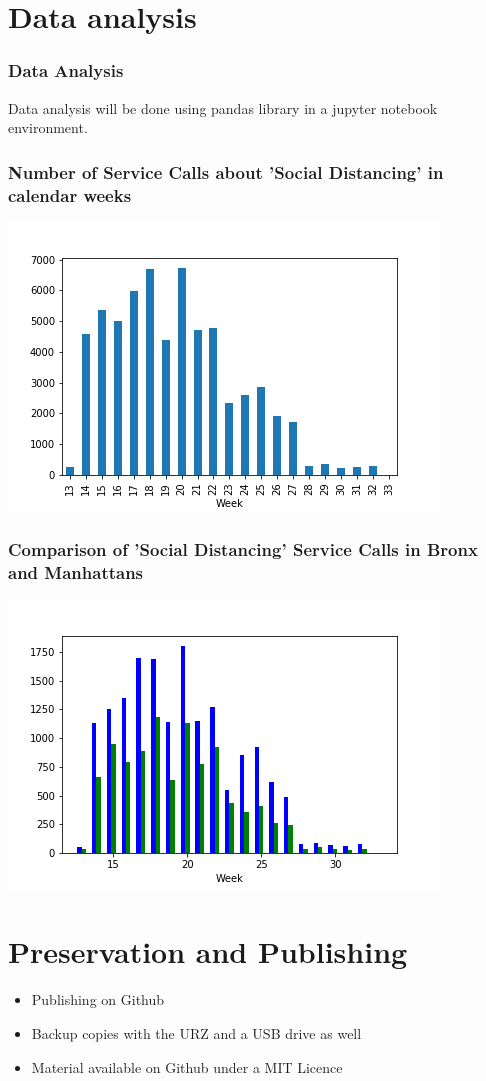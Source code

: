 \documentclass{beamer}
\begin{document}
\section{Data analysis}
\begin{frame}
\frametitle{Data Analysis}
Data analysis will be done using pandas library in a jupyter notebook environment.
\end{frame}
\begin{frame}
\frametitle{Number of Service Calls about 'Social Distancing' in calendar weeks}

\includegraphics[width=\textwidth]{pictures/bar.png}

\end{frame}
\begin{frame}
\frametitle{Comparison of 'Social Distancing' Service Calls in Bronx and Manhattans}

\includegraphics[width=\textwidth]{pictures/comp_bronx_manhattan.png}

\end{frame}
\section{Preservation and Publishing}
\begin{frame}
\begin{itemize}
\frametitle{Preservation and Publishing}
\item Publishing on Github
\vfill
\item Backup copies with the URZ and a USB drive as well
\vfill
\item Material available on Github under a MIT Licence
\end{itemize}
\end{frame}
\end{document}
